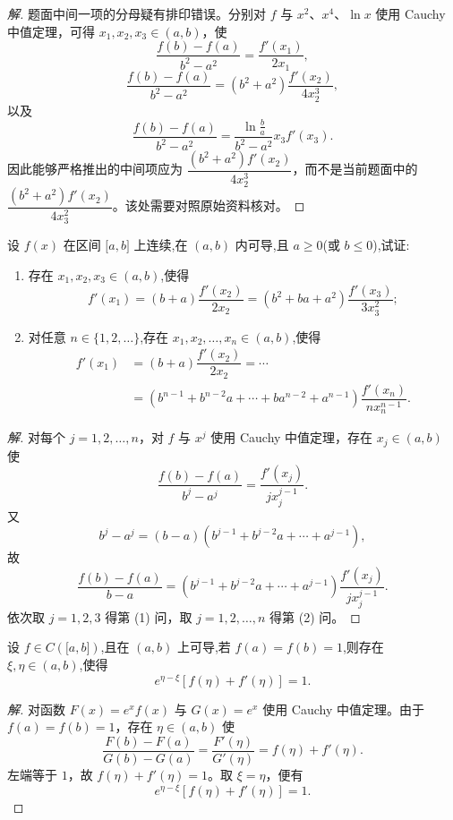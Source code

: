 \documentclass[../../数学分析培优讲义(答案版).tex]{subfiles}
\begin{document}
\begin{proof}[解]
题面中间一项的分母疑有排印错误。分别对 $f$ 与 $x^2$、$x^4$、$\ln x$ 使用 Cauchy 中值定理，可得 $x_1,x_2,x_3\in(a,b)$，使
\[
    \dfrac{f(b)-f(a)}{b^2-a^2}
    =\dfrac{f'(x_1)}{2x_1},
\]
\[
    \dfrac{f(b)-f(a)}{b^2-a^2}
    =(b^2+a^2)\dfrac{f'(x_2)}{4x_2^3},
\]
以及
\[
    \dfrac{f(b)-f(a)}{b^2-a^2}
    =\dfrac{\ln\frac{b}{a}}{b^2-a^2}x_3f'(x_3).
\]
因此能够严格推出的中间项应为 $\dfrac{(b^2+a^2)f'(x_2)}{4x_2^3}$，而不是当前题面中的 $\dfrac{(b^2+a^2)f'(x_2)}{4x_3^2}$。该处需要对照原始资料核对。
\end{proof}

\begin{example}
设 $f(x)$ 在区间 $\lbrack a,b\rbrack$ 上连续,在 $(a,b)$ 内可导,且 $a\geq0$(或 $b\leq0$),试证:
\begin{enumerate}[label=(\arabic*)]
    \item 存在 $x_1,x_2,x_3\in(a,b)$,使得
    \[
        f'(x_1)
        =(b+a)\dfrac{f'(x_2)}{2x_2}
        =(b^2+ba+a^2)\dfrac{f'(x_3)}{3x_3^2};
    \]
    \item 对任意 $n\in\{1,2,\ldots\}$,存在 $x_1,x_2,\ldots,x_n\in(a,b)$,使得
    \[
    \begin{aligned}
        f'(x_1)
        &=(b+a)\dfrac{f'(x_2)}{2x_2}
        =\cdots\\
        &=(b^{n-1}+b^{n-2}a+\cdots+ba^{n-2}+a^{n-1})
        \dfrac{f'(x_n)}{nx_n^{n-1}}.
    \end{aligned}
    \]
\end{enumerate}
\end{example}

\begin{proof}[解]
对每个 $j=1,2,\ldots,n$，对 $f$ 与 $x^j$ 使用 Cauchy 中值定理，存在 $x_j\in(a,b)$ 使
\[
    \dfrac{f(b)-f(a)}{b^j-a^j}
    =\dfrac{f'(x_j)}{jx_j^{j-1}}.
\]
又
\[
    b^j-a^j=(b-a)(b^{j-1}+b^{j-2}a+\cdots+a^{j-1}),
\]
故
\[
    \dfrac{f(b)-f(a)}{b-a}
    =(b^{j-1}+b^{j-2}a+\cdots+a^{j-1})
    \dfrac{f'(x_j)}{jx_j^{j-1}}.
\]
依次取 $j=1,2,3$ 得第 (1) 问，取 $j=1,2,\ldots,n$ 得第 (2) 问。
\end{proof}

\begin{example}
设 $f\in C(\lbrack a,b\rbrack)$,且在 $(a,b)$ 上可导,若 $f(a)=f(b)=1$,则存在 $\xi,\eta\in(a,b)$,使得
\[
    e^{\eta-\xi}[f(\eta)+f'(\eta)]=1.
\]
\end{example}

\begin{proof}[解]
对函数 $F(x)=e^x f(x)$ 与 $G(x)=e^x$ 使用 Cauchy 中值定理。由于 $f(a)=f(b)=1$，存在 $\eta\in(a,b)$ 使
\[
    \dfrac{F(b)-F(a)}{G(b)-G(a)}
    =\dfrac{F'(\eta)}{G'(\eta)}
    =f(\eta)+f'(\eta).
\]
左端等于 $1$，故 $f(\eta)+f'(\eta)=1$。取 $\xi=\eta$，便有
\[
    e^{\eta-\xi}[f(\eta)+f'(\eta)]=1.
\]
\end{proof}
\end{document}
